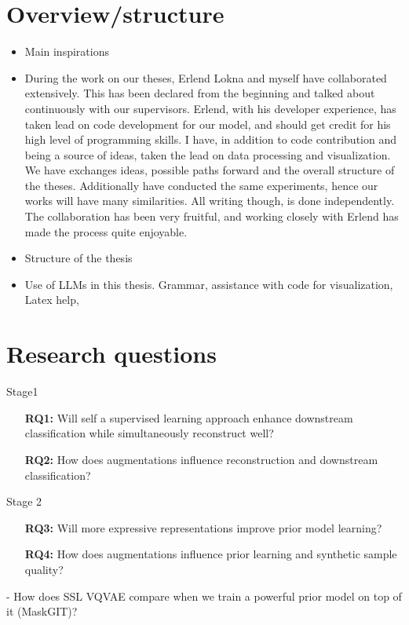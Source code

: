 \documentclass[../../thesis.tex]{subfiles}
\begin{document}
\section{Overview/structure}
\begin{itemize}
	\item Main inspirations \cite{TimeVQVAE} 
	\item During the work on our theses, Erlend Lokna and myself have collaborated extensively. This has been declared from the beginning and talked about continuously with our supervisors. Erlend, with his developer experience, has taken lead on code development for our model, and should get credit for his high level of programming skills. I have, in addition to code contribution and being a source of ideas, taken the lead on data processing and visualization. We have exchanges ideas, possible paths forward and the overall structure of the theses. Additionally have conducted the same experiments, hence our works will have many similarities. All writing though, is done independently. The collaboration has been very fruitful, and working closely with Erlend has made the process quite enjoyable. 
	\item Structure of the thesis
	\item Use of LLMs in this thesis. Grammar, assistance with code for visualization, Latex help, 
\end{itemize}
\section{Research questions}
Stage1
\begin{itemize}
	\item[\textbf{RQ1:}] Will self a supervised learning approach enhance downstream classification while simultaneously reconstruct well?
	\item[\textbf{RQ2:}] How does augmentations influence reconstruction and downstream classification? 
\end{itemize}
Stage 2
\begin{itemize}
	\item[\textbf{RQ3:}] Will more expressive representations improve prior model learning?
	\item[\textbf{RQ4:}] How does augmentations influence prior learning and synthetic sample quality?
\end{itemize}

	- How does SSL VQVAE compare when we train a powerful prior model on top of it (MaskGIT)? 
\end{document}
